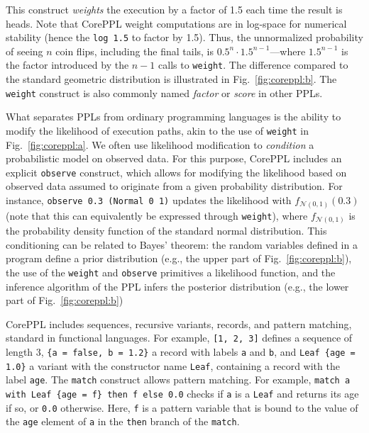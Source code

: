 \documentclass[runningheads]{llncs}
\newcommand{\clstinline}{\lstinline[language=CorePPL]}
\begin{document}
This construct \emph{weights} the execution by a factor of 1.5 each time the result is heads.
Note that CorePPL weight computations are in log-space for numerical stability (hence the \clstinline!log 1.5! to factor by 1.5).
Thus, the unnormalized probability of seeing $n$ coin flips, including the final tails, is $0.5^n\cdot1.5^{n-1}$---where $1.5^{n-1}$ is the factor introduced by the $n-1$ calls to \clstinline!weight!.
The difference compared to the standard geometric distribution is illustrated in Fig.~\ref{fig:coreppl:b}.
The \clstinline!weight! construct is also commonly named \emph{factor} or \emph{score} in other PPLs.

What separates PPLs from ordinary programming languages is the ability to modify the likelihood of execution paths, akin to the use of \clstinline!weight! in Fig.~\ref{fig:coreppl:a}.
We often use likelihood modification to \emph{condition} a probabilistic model on observed data.
For this purpose, CorePPL includes an explicit \clstinline!observe! construct, which allows for modifying the likelihood based on observed data assumed to originate from a given probability distribution.
For instance, \clstinline!observe 0.3 (Normal 0 1)! updates the likelihood with $f_{\mathcal{N}(0,1)}(0.3)$ (note that this can equivalently be expressed through \clstinline!weight!), where $f_{\mathcal{N}(0,1)}$ is the probability density function of the standard normal distribution.
This conditioning can be related to Bayes' theorem: the random variables defined in a program define a prior distribution (e.g., the upper part of Fig.~\ref{fig:coreppl:b}), the use of the \clstinline!weight! and \clstinline!observe! primitives a likelihood function, and the inference algorithm of the PPL infers the posterior distribution (e.g., the lower part of Fig.~\ref{fig:coreppl:b})

CorePPL includes sequences, recursive variants, records, and pattern matching, standard in functional languages.
For example, \clstinline![1, 2, 3]! defines a sequence of length 3, \clstinline!{a = false, b = 1.2}! a record with labels \lstinline!a! and \lstinline!b!, and \clstinline!Leaf {age = 1.0}! a variant with the constructor name \clstinline!Leaf!, containing a record with the label \lstinline!age!.
The \clstinline!match! construct allows pattern matching.
For example, \clstinline!match a with Leaf {age = f} then f else 0.0!
checks if \lstinline!a! is a \lstinline!Leaf! and returns its age if so, or \clstinline!0.0! otherwise.
Here, \clstinline!f! is a pattern variable that is bound to the value of the \clstinline!age! element of \clstinline!a! in the \clstinline!then! branch of the \clstinline!match!.
\end{document}
